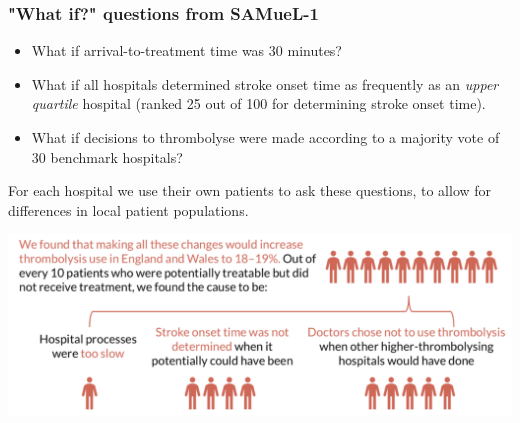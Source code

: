 \documentclass[xcolor={usenames,dvipsnames}]{beamer}
\begin{document}
\begin{frame}
\frametitle{"What if?" questions from SAMueL-1}


\begin{itemize}
    \footnotesize
    \item What if arrival-to-treatment time was 30 minutes?
    \item What if all hospitals determined stroke onset time as frequently as an \emph{upper quartile} hospital (ranked 25 out of 100 for determining stroke onset time).
    \item What if decisions to thrombolyse were made according to a majority vote of 30 benchmark hospitals?
\end{itemize}

\footnotesize{For each hospital we use their own patients to ask these questions, to allow for differences in local patient populations.}







\begin{center}
\includegraphics[width=1.0\textwidth]{./images/sam_summary_pt_3}
\end{center}

\end{frame}

\end{document}

